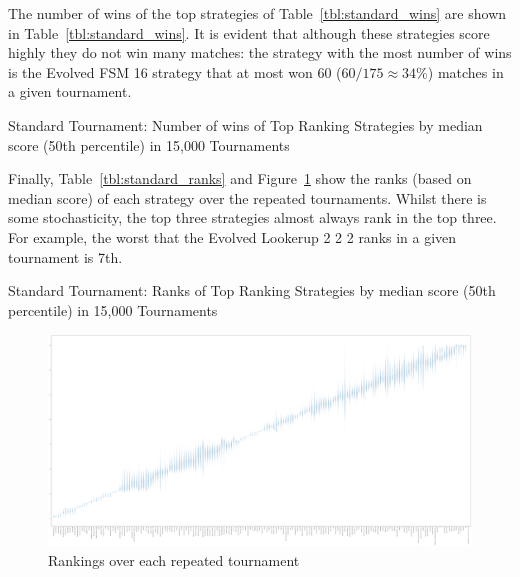\documentclass{article}
\begin{document}
The number of wins of the top strategies of Table~\ref{tbl:standard_wins} are
shown in Table~\ref{tbl:standard_wins}. It is evident that although these
strategies score highly they do not win many matches: the strategy with the most
number of wins is the Evolved FSM 16 strategy that at most won 60
(\(60/175\approx34\%\)) matches in a given tournament.

\begin{table}[!hbtp]
    \centering
        
        \caption{Standard Tournament: Number of wins of Top Ranking Strategies
        by median score (50th percentile) in 15,000 Tournaments}
        \label{tbl:standard_wins}
\end{table}

Finally, Table~\ref{tbl:standard_ranks} and
Figure~\ref{fig:standard_ranks_boxplot} show the ranks (based on median score)
of each strategy over the repeated tournaments. Whilst there is some
stochasticity, the top three strategies almost always rank in the top three. For
example, the worst that the Evolved Lookerup 2 2 2 ranks in a given tournament
is 7th.


\begin{table}[!hbtp]
    \centering
        
        \caption{Standard Tournament: Ranks of Top Ranking Strategies
        by median score (50th percentile) in 15,000 Tournaments}
        \label{tbl:standard_ranks}
\end{table}

\begin{landscape}
    \begin{figure}[!hbtp]
        \centering
        \includegraphics[width=\textwidth]{./assets/standard_ranks_boxplots.pdf}
        \caption{Rankings over each repeated tournament}
        \label{fig:standard_ranks_boxplot}
    \end{figure}
\end{landscape}
\end{document}
